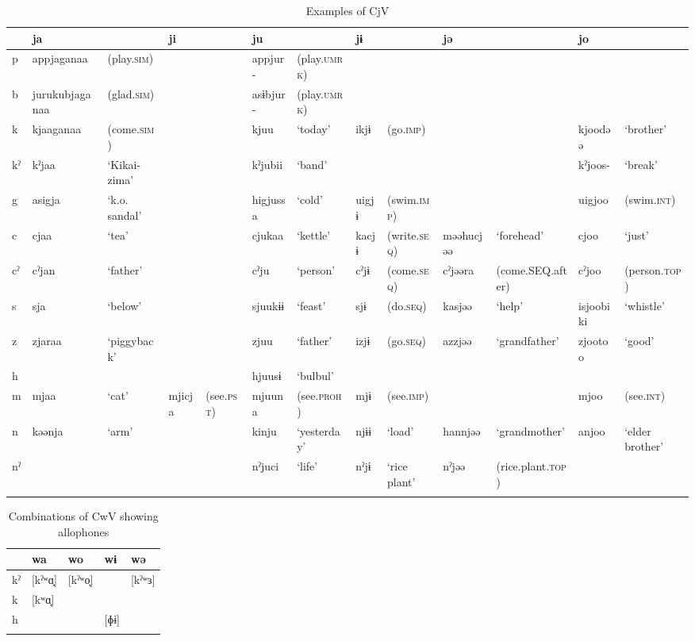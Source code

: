 \begin{sidewaystable}
\caption{Examples of CjV}
\footnotesize
\begin{tabular}{@{}l @{\hspace{.5em}}  *{5}{l@{ }l@{\hspace{.5em}}} l@{ } l@{}} 
\lsptoprule
 & ja &  & ji &  & ju &  & jɨ &  & jə &  & jo & \\\midrule
p & appjaganaa & (play.\textsc{sim}) &  &  & appjur- & (play.\textsc{umrk}) &  &  &  &  &  & \\
b & jurukubjaganaa & (glad.\textsc{sim}) & & &  asɨbjur- & (play.\textsc{umrk}) &  &  &  &  &  & \\
k & kjaaganaa & (come.\textsc{sim}) &  &  & kjuu & ‘today’ & ikjɨ & (go.\textsc{imp}) &  &  & kjoodəə & ‘brother’\\
kˀ & kˀjaa & ‘Kikai-zima’ &  &  & kˀjubii & ‘band’ &  &  &  &  & kˀjoos- & ‘break’\\
g & asigja & ‘k.o. sandal’ &  &  & higjussa & ‘cold’ & uigjɨ & (swim.\textsc{imp}) &  &  & uigjoo & (swim.\textsc{int})\\
c & cjaa & ‘tea’ &  &  & cjukaa & ‘kettle’ & kacjɨ & (write.\textsc{seq}) & məəhucjəə & ‘forehead’ & cjoo & ‘just’\\
cˀ & cˀjan & ‘father’ &  &  & cˀju & ‘person’ & cˀjɨ & (come.\textsc{seq}) & cˀjəəra & (come.SEQ.after) & cˀjoo & (person.\textsc{top})\\
s & sja & ‘below’ &  &  & sjuukɨɨ & ‘feast’ & sjɨ & (do.\textsc{seq}) & kasjəə & ‘help’ & isjoobiki & ‘whistle’\\
z & zjaraa & ‘piggyback’ &  &  & zjuu & ‘father’ & izjɨ & (go.\textsc{seq}) & azzjəə & ‘grandfather’ & zjootoo & ‘good’\\
h &  &  &  &  & hjuusɨ & ‘bulbul’ &  &  &  &  &  & \\
m & mjaa & ‘cat’ & mjicja & (see.\textsc{pst})  & mjuuna & (see.\textsc{proh}) & mjɨ & (see.\textsc{imp}) &  &  & mjoo & (see.\textsc{int})\\
n & kəənja & ‘arm’ &  &  & kinju & ‘yesterday’ & njɨɨ & ‘load’ & hannjəə & ‘grandmother’ & anjoo & ‘elder brother’\\
nˀ &  &  &  &  & nˀjuci & ‘life’ & nˀjɨ & ‘rice plant’ & nˀjəə & (rice.plant.\textsc{top}) &  & \\
\lspbottomrule
\end{tabular}
\end{sidewaystable}


\begin{table}
\caption{Combinations of CwV showing allophones\label{bkm:Ref365009143}}
\begin{tabularx}{\textwidth}{lQQQQ}
\lsptoprule
   & wa &  wo &  wɨ & wə\\\midrule
kˀ &  [kˀʷɑ̟] & [kˀʷo̞]   & & [kˀʷɜ]\\
k  &  [kʷɑ̟]      \\
h  &          &      & [ɸɨ]  \\
\lspbottomrule
\end{tabularx}
\end{table}


